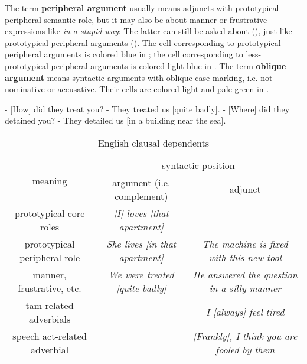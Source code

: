 \documentclass[UTF8, a4paper, oneside, scheme=plain]{ctexrep}
\newcommand*{\concept}[1]{\textbf{#1}}
\newcommand{\corpus}[1]{\emph{#1}}
\begin{document}
The term \concept{peripheral argument}
usually means adjuncts with prototypical peripheral semantic role,
but it may also be about manner or frustrative expressions like \corpus{in a stupid way}:
The latter can still be asked about (), 
just like prototypical peripheral arguments (). 
The cell corresponding to prototypical peripheral arguments
is colored blue in ;
the cell corresponding to less-prototypical peripheral arguments
is colored light blue in .
The term \concept{oblique argument} 
means syntactic arguments with oblique case marking, i.e. not nominative or accusative.
Their cells are colored light and pale green in .

\begin{exe}
    \ex\label{ex:simple-clause.dependents.ex-1} - [How] did they treat you? - They treated us [quite badly].
    \ex\label{ex:simple-clause.dependents.ex-2} - [Where] did they detained you? - They detailed us [in a building near the sea].
\end{exe}

\begin{table}[H]
    \caption{English clausal dependents}
    \label{tbl:clausal-dependent}
    \begin{tabular}{ccc}
    \toprule
    \multirow{2}{*}{meaning}      & \multicolumn{2}{c}{syntactic position}                                                       \\ \cmidrule{2-3}
                                  & argument (i.e. complement)                             & adjunct                                             \\ \midrule
    prototypical core roles       & \cellcolor[HTML]{32CB00}\corpus{[I] loves [that apartment]}             & \\ 
    prototypical peripheral role  & \cellcolor[HTML]{34FF34}\corpus{She lives [in that apartment]} & \cellcolor[HTML]{34CDF9}\corpus{The machine is fixed with this new tool}    \\
    manner, frustrative, etc.     & \cellcolor[HTML]{DAE8FC}\cellcolor[HTML]{67FD9A}\corpus{We were treated [quite badly]} & \cellcolor[HTML]{DAE8FC}\corpus{He answered the question in a silly manner} \\
    \acs{tam}-related adverbials &                                        & \cellcolor[HTML]{ECF4FF}\corpus{I [always] feel tired}                      \\
    speech act-related adverbial  &                                        & \corpus{[Frankly], I think you are fooled by them} \\ \bottomrule
    \end{tabular}
\end{table}
\end{document}
